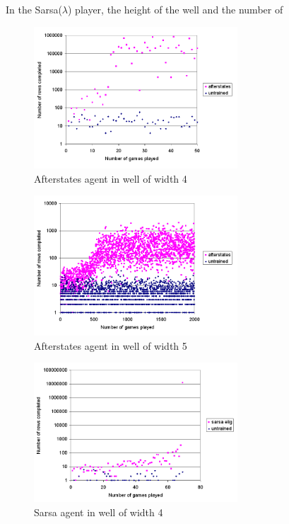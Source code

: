 \documentclass{rucsthesis}
\begin{document}
In the Sarsa($\lambda$) player, the height of the well and the number of 
\begin{figure}[h]
\centering
\includegraphics[width=3in]{Afterstatesredtet4well.png}
\caption{Afterstates agent in well of width 4}
\label{fig:comparemelax}
\end{figure}

\begin{figure}[h]
\centering
\includegraphics[width=3in]{Afterstatesredtet5well.png}
\caption{Afterstates agent in well of width 5}
\label{fig:comparemelax}
\end{figure}

\begin{figure}[h]
\centering
\includegraphics[width=3in]{sarsaeligredtet4well.png}
\caption{Sarsa agent in well of width 4}
\label{fig:comparemelax}
\end{figure}
\end{document}
